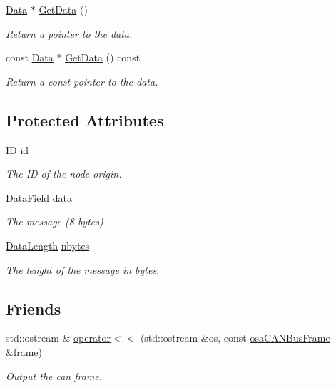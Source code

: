 \begin{DoxyCompactItemize}
\hyperlink{classosa_c_a_n_bus_frame_a938f540c9de33b240d3bc4f21c341ba5}{Data} $\ast$ \hyperlink{classosa_c_a_n_bus_frame_ac9a92b54cd93f9125c35bbfb4b1c0cc5}{Get\+Data} ()
\begin{DoxyCompactList}\small\item\em Return a pointer to the data. \end{DoxyCompactList}\item 
const \hyperlink{classosa_c_a_n_bus_frame_a938f540c9de33b240d3bc4f21c341ba5}{Data} $\ast$ \hyperlink{classosa_c_a_n_bus_frame_a43ef25ac96b0ecebadfa8fc3e5709353}{Get\+Data} () const 
\begin{DoxyCompactList}\small\item\em Return a const pointer to the data. \end{DoxyCompactList}\end{DoxyCompactItemize}
\subsection*{Protected Attributes}
\begin{DoxyCompactItemize}
\item 
\hyperlink{classosa_c_a_n_bus_frame_ae917bcfe6427b2055a405716909c6048}{I\+D} \hyperlink{classosa_c_a_n_bus_frame_a43c2a396a6f7dcf502daeb8f3cc8967e}{id}
\begin{DoxyCompactList}\small\item\em The I\+D of the node origin. \end{DoxyCompactList}\item 
\hyperlink{classosa_c_a_n_bus_frame_ac41162892eefb85a1308d485ec630969}{Data\+Field} \hyperlink{classosa_c_a_n_bus_frame_ae5114021468fe3ca35f95ec123db1e2d}{data}
\begin{DoxyCompactList}\small\item\em The message (8 bytes) \end{DoxyCompactList}\item 
\hyperlink{classosa_c_a_n_bus_frame_ab5bacbd4959a9046925438af889744f4}{Data\+Length} \hyperlink{classosa_c_a_n_bus_frame_abc694b0742e9c5b7e2db8640caa17565}{nbytes}
\begin{DoxyCompactList}\small\item\em The lenght of the message in bytes. \end{DoxyCompactList}\end{DoxyCompactItemize}
\subsection*{Friends}
\begin{DoxyCompactItemize}
\item 
std\+::ostream \& \hyperlink{classosa_c_a_n_bus_frame_ac61918af64d7f16800905a9fbb02d8a5}{operator$<$$<$} (std\+::ostream \&os, const \hyperlink{classosa_c_a_n_bus_frame}{osa\+C\+A\+N\+Bus\+Frame} \&frame)
\begin{DoxyCompactList}\small\item\em Output the can frame. \end{DoxyCompactList}\end{DoxyCompactItemize}


